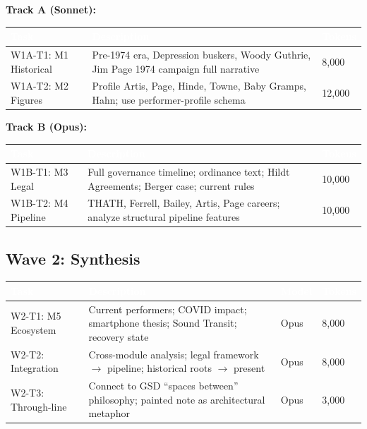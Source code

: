 \documentclass[11pt,letterpaper]{article}
\newcommand{\tableheader}[1]{\textbf{\sffamily\textcolor{white}{#1}}}
\begin{document}
\textbf{Track A (Sonnet):}

\begin{center}
\begin{tabularx}{\textwidth}{L{2.5cm}XC{2cm}}
\toprule
{}
\tableheader{Task} & \tableheader{Description} & \tableheader{Tokens} \\
\midrule
W1A-T1: M1 Historical & Pre-1974 era, Depression buskers, Woody Guthrie, Jim Page 1974 campaign full narrative & 8,000 \\
W1A-T2: M2 Figures & Profile Artis, Page, Hinde, Towne, Baby Gramps, Hahn; use performer-profile schema & 12,000 \\
\bottomrule
\end{tabularx}
\end{center}

\textbf{Track B (Opus):}

\begin{center}
\begin{tabularx}{\textwidth}{L{2.5cm}XC{2cm}}
\toprule
{}
\tableheader{Task} & \tableheader{Description} & \tableheader{Tokens} \\
\midrule
W1B-T1: M3 Legal & Full governance timeline; ordinance text; Hildt Agreements; Berger case; current rules & 10,000 \\
W1B-T2: M4 Pipeline & THATH, Ferrell, Bailey, Artis, Page careers; analyze structural pipeline features & 10,000 \\
\bottomrule
\end{tabularx}
\end{center}

\subsection{Wave 2: Synthesis}

\begin{center}
\begin{tabularx}{\textwidth}{L{2.5cm}XC{2cm}C{2cm}}
\toprule
{}
\tableheader{Task} & \tableheader{Description} & \tableheader{Model} & \tableheader{Tokens} \\
\midrule
W2-T1: M5 Ecosystem & Current performers; COVID impact; smartphone thesis; Sound Transit; recovery state & Opus & 8,000 \\
W2-T2: Integration & Cross-module analysis; legal framework $\rightarrow$ pipeline; historical roots $\rightarrow$ present & Opus & 8,000 \\
W2-T3: Through-line & Connect to GSD ``spaces between'' philosophy; painted note as architectural metaphor & Opus & 3,000 \\
\bottomrule
\end{tabularx}
\end{center}
\end{document}
